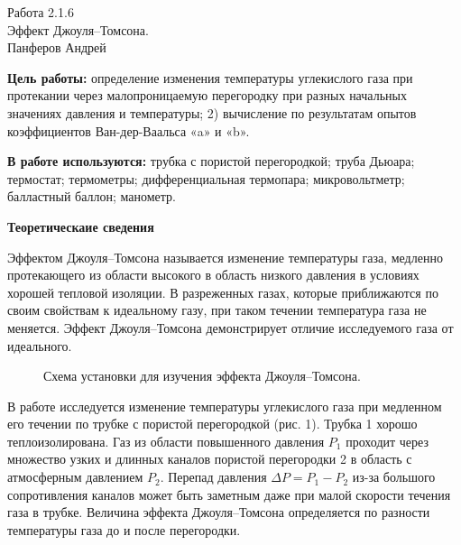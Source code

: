 



\begin{center}
  \LARGE{Работа 2.1.6}\\[0.2cm]
  \LARGE{Эффект Джоуля–Томсона.}\\[0.2cm]
  \large{Панферов Андрей}\\[0.2cm]
\end{center}


\textbf{Цель работы:} определение изменения температуры углекислого газа при протекании через малопроницаемую перегородку при разных начальных значениях давления и температуры; 2) вычисление по результатам опытов коэффициентов Ван-дер-Ваальса «a» и «b».

\textbf{В работе используются:} трубка с пористой перегородкой; труба Дьюара; термостат; термометры; дифференциальная термопара; микровольтметр; балластный баллон; манометр.

\textbf{Теоретическаие сведения}

Эффектом Джоуля–Томсона называется изменение температуры газа, медленно протекающего из области высокого в область низкого давления в условиях хорошей тепловой изоляции. В разреженных газах, которые приближаются по своим свойствам к идеальному газу, при таком течении температура газа не меняется. Эффект Джоуля–Томсона демонстрирует отличие исследуемого газа от идеального.\\

\begin{figure}[h!]
\caption{Схема установки для изучения эффекта Джоуля–Томсона.}
\end{figure}

В работе исследуется изменение температуры углекислого газа при медленном его течении по трубке с пористой перегородкой (рис. 1). Трубка 1 хорошо теплоизолирована. Газ из области повышенного давления $P_1$ проходит через множество узких и длинных каналов пористой перегородки 2 в область с атмосферным давлением $P_2$. Перепад давления $\Delta P = P_1 - P_2$ из-за большого сопротивления каналов может быть заметным даже при малой скорости течения газа в трубке. Величина эффекта Джоуля–Томсона определяется по разности температуры газа до и после перегородки.\\

